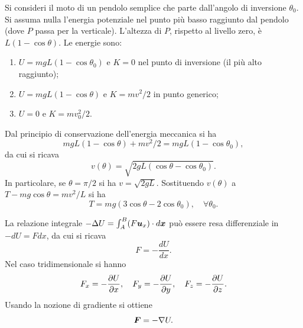 \begin{ex}
    Si consideri il moto di un pendolo semplice che parte dall'angolo di inversione $\theta_0$. Si assuma nulla l'energia potenziale nel punto più basso raggiunto dal pendolo (dove $P$ passa per la verticale). L'altezza di $P$, rispetto al livello zero, è $L(1-\cos{\theta})$. Le energie sono:
    \begin{enumerate}
        \item $U=mgL(1-\cos{\theta_0})$ e $K=0$ nel punto di inversione (il più alto raggiunto);
        \item $U=mgL(1-\cos\theta)$ e $K=mv^2/2$ in punto generico;
        \item $U=0$ e $K=mv_0^2/2$.
    \end{enumerate}
    Dal principio di conservazione dell'energia meccanica si ha
    \begin{equation}
        mgL(1-\cos{\theta})+mv^2/2=mgL(1-\cos{\theta_0}),
    \end{equation}
    da cui si ricava
    \begin{equation}
        v(\theta)=\sqrt{2gL(\cos{\theta}-\cos{\theta_0})}.
    \end{equation}
    In particolare, se $\theta=\pi/2$ si ha $v=\sqrt{2gL}$. Sostituendo $v(\theta)$ a $T-mg\cos{\theta}=mv^2/L$ si ha
    \begin{equation}
        T=mg(3\cos{\theta}-2\cos{\theta_0}),\quad\forall\theta_0.
    \end{equation}
\end{ex}
\begin{obs}
    La relazione integrale $-\Delta U=\int_A^B(F\bm{u}_x)\cdot d\bm{x}$ può essere resa differenziale in $-dU=Fdx$, da cui si ricava
    \begin{equation}
        F=-\frac{dU}{dx}.
    \end{equation}
    Nel caso tridimensionale si hanno
    \begin{equation}
        F_x=-\frac{\partial U}{\partial x},\quad F_y=-\frac{\partial U}{\partial y},\quad F_z=-\frac{\partial U}{\partial z}.
    \end{equation}
    Usando la nozione di gradiente si ottiene
    \begin{equation}
        \bm{F}=-\nabla U.
    \end{equation}
\end{obs}

